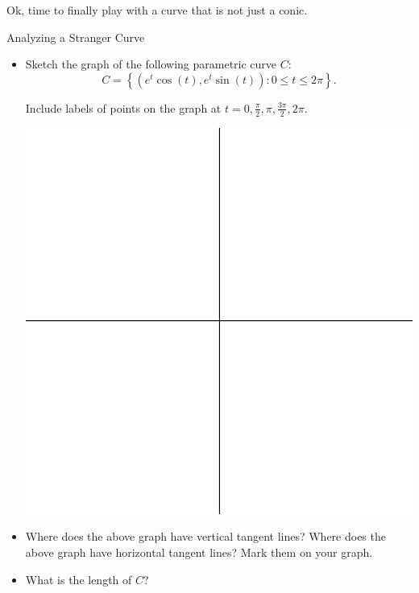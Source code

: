 Ok, time to finally play with a curve that is not just a conic.

\begin{exercise}{Analyzing a Stranger Curve \Coffeecup \Coffeecup \Coffeecup}

\begin{itemize}
\item Sketch the graph of the following parametric curve $C$: $$ C=\left\{ \left( e^t\cos(t),e^t\sin(t)\right): 0\leq t\leq 2\pi\right\}.$$

Include labels of points on the graph at $t=0,\frac{\pi}{2},\pi, \frac{3\pi}{2}, 2\pi$.

\begin{center}
\includegraphics[scale=0.8]{quadall}
\end{center}

\item Where does the above graph have vertical tangent lines?  Where does the above graph have horizontal tangent lines?  Mark them on your graph.

\vspace*{1in}

\item What is the length of $C$?

\vspace*{1in}

\end{itemize}
\end{exercise}

